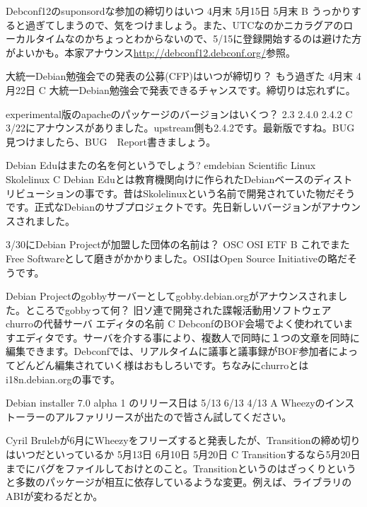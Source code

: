 \santaku
{Debconf12のsuponsordな参加の締切りはいつ}
{4月末}
{5月15日}
{5月末}
{B}
{うっかりすると過ぎてしまうので、気をつけましょう。また、UTCなのかニカラグアのローカルタイムなのかちょっとわからないので、5/15に登録開始するのは避けた方がよいかも。本家アナウンス\url{http://debconf12.debconf.org/}参照。}

\santaku
{大統一Debian勉強会での発表の公募(CFP)はいつが締切り？}
{もう過ぎた}
{4月末}
{4月22日}
{C}
{大統一Debian勉強会で発表できるチャンスです。締切りは忘れずに。}

\santaku
{experimental版のapacheのパッケージのバージョンはいくつ？}
{2.3}
{2.4.0}
{2.4.2}
{C}
{3/22にアナウンスがありました。upstream側も2.4.2です。最新版ですね。BUG見つけましたら、BUG　Report書きましょう。}

\santaku
{Debian Eduはまたの名を何というでしょう?}
{emdebian}
{Scientific Linux}
{Skolelinux}
{C}
{Debian Eduとは教育機関向けに作られたDebianベースのディストリビューションの事です。昔はSkolelinuxという名前で開発されていた物だそうです。正式なDebianのサブプロジェクトです。先日新しいバージョンがアナウンスされました。}

\santaku
{3/30にDebian Projectが加盟した団体の名前は？}
{OSC}
{OSI}
{ETF}
{B}
{これでまたFree Softwareとして磨きがかかりました。OSIはOpen Source Initiativeの略だそうです。}

\santaku
{Debian Projectのgobbyサーバーとしてgobby.debian.orgがアナウンスされました。ところでgobbyって何？}
{旧ソ連で開発された諜報活動用ソフトウェア}
{churroの代替サーバ}
{エディタの名前}
{C}
{DebconfのBOF会場でよく使われていますエディタです。サーバを介する事により、複数人で同時に１つの文章を同時に編集できます。Debconfでは、リアルタイムに議事と議事録がBOF参加者によってどんどん編集されていく様はおもしろいです。ちなみにchurroとはi18n.debian.orgの事です。}

\santaku
{Debian installer 7.0 alpha 1 のリリース日は}
{5/13}
{6/13}
{4/13}
{A}
{Wheezyのインストーラーのアルファリリースが出たので皆さん試してください。}

\santaku
{Cyril Brulebが6月にWheezyをフリーズすると発表したが、Transitionの締め切りはいつだといっているか}
{5月13日}
{6月10日}
{5月20日}
{C}
{Transitionするなら5月20日までにバグをファイルしておけとのこと。Transitionというのはざっくりというと多数のパッケージが相互に依存しているような変更。例えば、ライブラリのABIが変わるだとか。}
